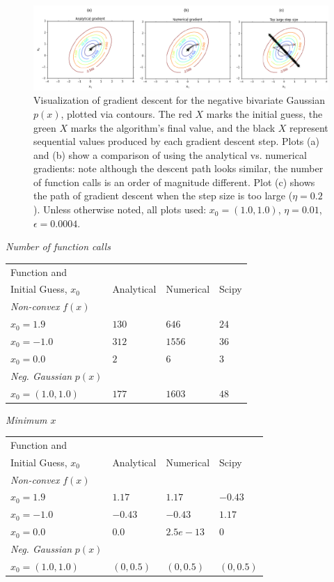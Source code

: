\documentclass{article}
\begin{document}
\begin{figure}[!ht]
\centering
\includegraphics[scale=0.9]{negGaussianDescent.pdf}
\caption{Visualization of gradient descent for the negative bivariate Gaussian $p(x)$, plotted via contours.  The red $X$ marks the initial guess, the green $X$ marks the algorithm's final value, and the black $X$ represent sequential values produced by each gradient descent step.  Plots (a) and (b) show a comparison of using the analytical vs. numerical gradients: note although the descent path looks similar, the number of function calls is an order of magnitude different.   Plot (c) shows the path of gradient descent when the step size is too large ($\eta = 0.2$). Unless otherwise noted, all plots used: $x_0 = (1.0,1.0)$, $\eta = 0.01$, $\epsilon = 0.0004$.}
\label{gauss}
\end{figure}



\textit{Number of function calls}

\begin{tabular}{|l|l|l|l|}
\hline
Function and & & &\\ Initial Guess, $x_0$ & Analytical & Numerical & Scipy \\ \hline
\textit{Non-convex} $f(x)$ & & &\\ \hline
$x_0 = 1.9$ & $130$ & $646$ & $24$\\\hline
$x_0 = -1.0$ & $312$ & $1556$ & $36$ \\ \hline
$x_0 = 0.0$ & $2$ & $6$ & $3$\\ \hline
\textit{Neg. Gaussian} $p(x)$ & & & \\ \hline
$x_0 = (1.0,1.0)$ & $177$ & $1603$ & $48$ \\ \hline
\end{tabular}

\textit{Minimum $x$}

\begin{tabular}{|l|l|l|l|}
\hline
Function and & & &\\ Initial Guess, $x_0$ & Analytical & Numerical & Scipy \\ \hline
\textit{Non-convex} $f(x)$ & & &\\ \hline
$x_0 = 1.9$ & $1.17$ & $1.17$ & $-0.43$\\\hline
$x_0 = -1.0$ & $-0.43$ & $-0.43$ & $1.17$ \\ \hline
$x_0 = 0.0$ & $0.0$ & $2.5e-13$ & $0$\\ \hline
\textit{Neg. Gaussian} $p(x)$ & & & \\ \hline
$x_0 = (1.0,1.0)$ & $(0,0.5)$ & $(0,0.5)$ & $(0,0.5)$ \\ \hline
\end{tabular}
\end{document}

